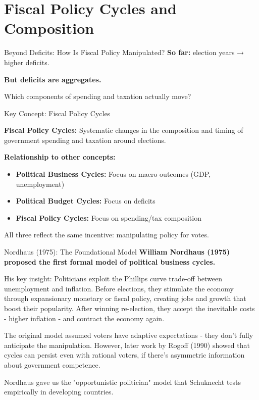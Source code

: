 \documentclass[10pt]{beamer}
\begin{document}
\section{Fiscal Policy Cycles and Composition}

\begin{frame}{Beyond Deficits: How Is Fiscal Policy Manipulated?}
\textbf{So far:} election years → higher deficits.

\vspace{0.4cm}
\textbf{But deficits are aggregates.}

\vspace{0.4cm}
\alert{Which components of spending and taxation actually move?}
\end{frame}

\begin{frame}{Key Concept: Fiscal Policy Cycles}
\begin{tcolorbox}[colback=myTeal!5, colframe=myTeal, title=Definition]
\textbf{Fiscal Policy Cycles:} Systematic changes in the composition and timing of government spending and taxation around elections.
\end{tcolorbox}

\vspace{0.3cm}
\textbf{Relationship to other concepts:}
\begin{itemize}
\item \textbf{Political Business Cycles:} Focus on macro outcomes (GDP, unemployment)
\item \textbf{Political Budget Cycles:} Focus on deficits
\item \textbf{Fiscal Policy Cycles:} Focus on spending/tax composition
\end{itemize}

\vspace{0.3cm}
\alert{All three reflect the same incentive: manipulating policy for votes.}
\end{frame}

\begin{frame}{Nordhaus (1975): The Foundational Model}
\textbf{William Nordhaus (1975) proposed the first formal model of political business cycles.}

\vspace{0.3cm}
His key insight: Politicians exploit the Phillips curve trade-off between unemployment and inflation. Before elections, they stimulate the economy through expansionary monetary or fiscal policy, creating jobs and growth that boost their popularity. After winning re-election, they accept the inevitable costs - higher inflation - and contract the economy again.
   
The original model assumed voters have \alert{adaptive expectations} - they don't fully anticipate the manipulation. However, later work by Rogoff (1990) showed that cycles can persist even with rational voters, if there's asymmetric information about government competence.

\alert{Nordhaus gave us the "opportunistic politician" model that Schuknecht tests empirically in developing countries.}
\end{frame}
\end{document}
